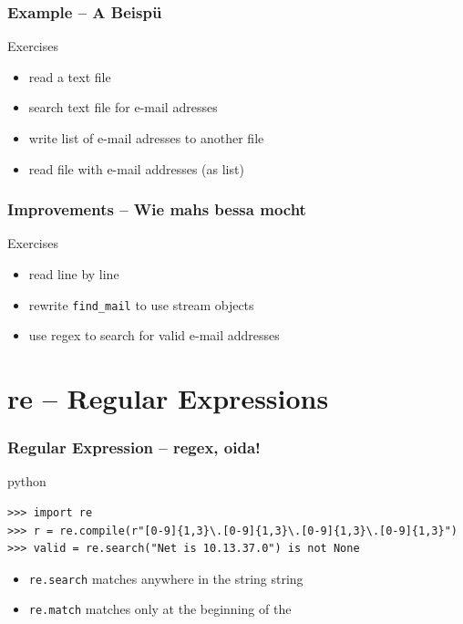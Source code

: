 \documentclass{beamer}
\begin{document}
\begin{frame}[fragile]
	\frametitle{Example -- A Beispü}
	
	\begin{block}{Exercises}
	\begin{itemize}
	\item[\checkmark] read a text file
	\item[\checkmark] search text file for e-mail adresses
	\item[\checkmark] write list of e-mail adresses to another file
	\item[\checkmark] read file with e-mail addresses (as list)
	\end{itemize}
	\end{block}

\end{frame}

\begin{frame}[fragile]
	\frametitle{Improvements -- Wie mahs bessa mocht}
	
	\begin{block}{Exercises}
	\begin{itemize}
	\item[\checkmark] read line by line
	\item[\checkmark] rewrite \texttt{find\_mail} to use stream objects
	\item[\checkmark] use regex to search for valid e-mail addresses
	\end{itemize}
	\end{block}

\end{frame}

\section{re -- Regular Expressions}


\begin{frame}[fragile]
	\frametitle{Regular Expression -- regex, oida!}
	
	\begin{exampleblock}{python}
	\begin{lstlisting}
>>> import re
>>> r = re.compile(r"[0-9]{1,3}\.[0-9]{1,3}\.[0-9]{1,3}\.[0-9]{1,3}")
>>> valid = re.search("Net is 10.13.37.0") is not None
	\end{lstlisting}
	\end{exampleblock}
	
	\begin{itemize}
	\item \texttt{re.search} matches anywhere in the string string
	\item \texttt{re.match} matches only at the beginning of the
	\end{itemize}
\end{frame}
\end{document}
